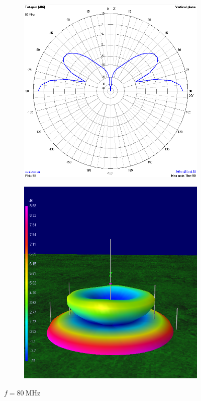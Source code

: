\begin{figure}[H]
	\begin{subfigure}{0.5\textwidth}
		\includegraphics[scale=0.43]{imagenes/2D_80MHz_tierra.png}
	\end{subfigure}	
	\quad
	\begin{subfigure}{0.5\textwidth}
		\includegraphics[scale=0.43]{imagenes/3D_80MHz_tierra.png}
	\end{subfigure}
	\caption{$f=\SI{80}{\mega\hertz}$}
	\label{fig.radiacion_80M_tierra}
\end{figure}


